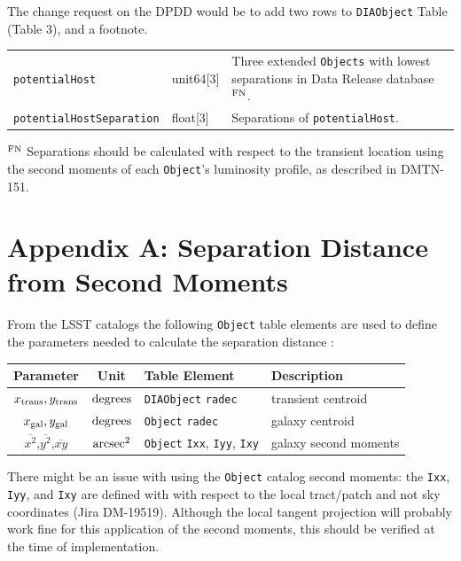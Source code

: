 \documentclass[DM,authoryear,toc]{lsstdoc}
\begin{document}
The change request on the DPDD would be to add two rows to {\tt DIAObject} Table (Table 3), and a footnote.

\begin{tabular}{p{4.5cm} p{2cm} p{8cm}}
{\tt potentialHost} & unit64[3] & Three extended {\tt Objects} with lowest separations in Data Release database$^{\rm FN}$. \\
{\tt potentialHostSeparation} & float[3] & Separations of {\tt potentialHost}.   \\
\end{tabular}

$^{\rm FN}$ Separations should be calculated with respect to the transient location using the second moments of each {\tt Object}'s luminosity profile, as described in DMTN-151.



\clearpage
\section{Appendix A: Separation Distance from Second Moments}\label{sec:appA}

From the LSST catalogs the following {\tt Object} table elements are used to define the parameters needed to calculate the separation distance :

\begin{center}
\begin{tabular}{ccll}
\hline
Parameter & Unit & Table Element & Description \\
\hline
$x_{\rm trans},y_{\rm trans}$ & $\rm degrees$ & {\tt DIAObject} {\tt radec} & transient centroid  \\
$x_{\rm gal},y_{\rm gal}$       & $\rm degrees$ & {\tt Object} {\tt radec}       & galaxy centroid      \\
$\overline{x^2}$,$\overline{y^2}$,$\overline{xy}$ & $\rm arcsec^2$  & {\tt Object} {\tt Ixx}, {\tt Iyy}, {\tt Ixy} & galaxy second moments \\
\hline
\end{tabular}
\end{center}

There might be an issue with using the {\tt Object} catalog second moments: the {\tt Ixx}, {\tt Iyy}, and {\tt Ixy} are defined with with respect to the local tract/patch and not sky coordinates (Jira DM-19519).
Although the local tangent projection will probably work fine for this application of the second moments, this should be verified at the time of implementation.
\end{document}
